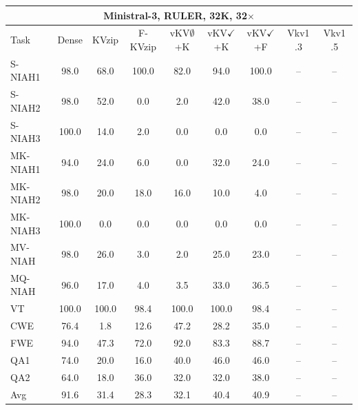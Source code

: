 \begin{tabular}{lcccccccc}
\toprule
\multicolumn{9}{c}{Ministral-3, RULER, 32K, 32$\times$} \\
\midrule
Task & Dense & KVzip & F-KVzip & vKV$\emptyset$+K & vKV$\checkmark$+K & vKV$\checkmark$+F & Vkv1 .3 & Vkv1 .5 \\
\midrule
S-NIAH1 & 98.0 & 68.0 & 100.0 & 82.0 & 94.0 & 100.0 & -- & -- \\
S-NIAH2 & 98.0 & 52.0 & 0.0 & 2.0 & 42.0 & 38.0 & -- & -- \\
S-NIAH3 & 100.0 & 14.0 & 2.0 & 0.0 & 0.0 & 0.0 & -- & -- \\
MK-NIAH1 & 94.0 & 24.0 & 6.0 & 0.0 & 32.0 & 24.0 & -- & -- \\
MK-NIAH2 & 98.0 & 20.0 & 18.0 & 16.0 & 10.0 & 4.0 & -- & -- \\
MK-NIAH3 & 100.0 & 0.0 & 0.0 & 0.0 & 0.0 & 0.0 & -- & -- \\
MV-NIAH & 98.0 & 26.0 & 3.0 & 2.0 & 25.0 & 23.0 & -- & -- \\
MQ-NIAH & 96.0 & 17.0 & 4.0 & 3.5 & 33.0 & 36.5 & -- & -- \\
VT & 100.0 & 100.0 & 98.4 & 100.0 & 100.0 & 98.4 & -- & -- \\
CWE & 76.4 & 1.8 & 12.6 & 47.2 & 28.2 & 35.0 & -- & -- \\
FWE & 94.0 & 47.3 & 72.0 & 92.0 & 83.3 & 88.7 & -- & -- \\
QA1 & 74.0 & 20.0 & 16.0 & 40.0 & 46.0 & 46.0 & -- & -- \\
QA2 & 64.0 & 18.0 & 36.0 & 32.0 & 32.0 & 38.0 & -- & -- \\
\midrule
Avg & 91.6 & 31.4 & 28.3 & 32.1 & 40.4 & 40.9 & -- & -- \\
\bottomrule
\end{tabular}
\vspace{0.8em}

